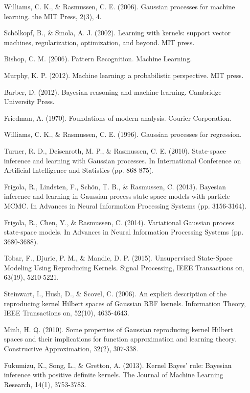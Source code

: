 \begin{thebibliography}{99}
 Williams, C. K., \& Rasmussen, C. E. (2006). Gaussian processes
for machine learning. the MIT Press, 2(3), 4.

 Sch\"{o}lkopf, B., \& Smola, A. J. (2002). Learning with
kernels: support vector machines, regularization, optimization, and beyond.
MIT press.

 Bishop, C. M. (2006). Pattern Recognition. Machine Learning.

 Murphy, K. P. (2012). Machine learning: a probabilistic
perspective. MIT press.

 Barber, D. (2012). Bayesian reasoning and machine learning.
Cambridge University Press.

 Friedman, A. (1970). Foundations of modern analysis. Courier
Corporation.

 Williams, C. K., \& Rasmussen, C. E. (1996). Gaussian processes
for regression.

 Turner, R. D., Deisenroth, M. P., \& Rasmussen, C. E. (2010).
State-space inference and learning with Gaussian processes. In International
Conference on Artificial Intelligence and Statistics (pp. 868-875).

 Frigola, R., Lindsten, F., Sch\"{o}n, T. B., \& Rasmussen, C.
(2013). Bayesian inference and learning in Gaussian process state-space
models with particle MCMC. In Advances in Neural Information Processing
Systems (pp. 3156-3164).

 Frigola, R., Chen, Y., \& Rasmussen, C. (2014). Variational
Gaussian process state-space models. In Advances in Neural Information
Processing Systems (pp. 3680-3688).

 Tobar, F., Djuric, P. M., \& Mandic, D. P. (2015). Unsupervised
State-Space Modeling Using Reproducing Kernels. Signal Processing, IEEE
Transactions on, 63(19), 5210-5221.

 Steinwart, I., Hush, D., \& Scovel, C. (2006). An explicit
description of the reproducing kernel Hilbert spaces of Gaussian RBF
kernels. Information Theory, IEEE Transactions on, 52(10), 4635-4643.

 Minh, H. Q. (2010). Some properties of Gaussian reproducing
kernel Hilbert spaces and their implications for function approximation and
learning theory. Constructive Approximation, 32(2), 307-338.

 Fukumizu, K., Song, L., \& Gretton, A. (2013). Kernel Bayes'
rule: Bayesian inference with positive definite kernels. The Journal of
Machine Learning Research, 14(1), 3753-3783.


\end{thebibliography}
